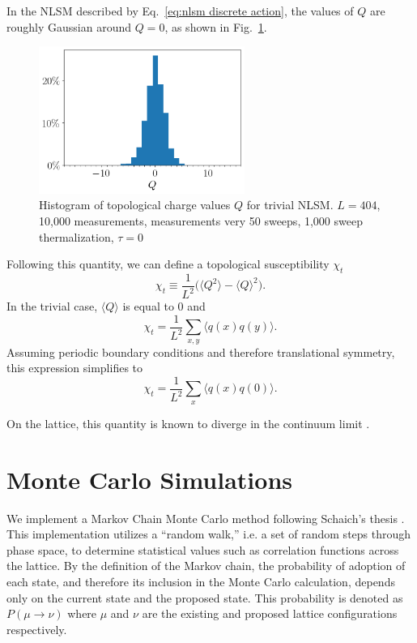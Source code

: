 In the NLSM described by Eq.~\ref{eq:nlsm discrete action}, the values of $Q$ are roughly Gaussian around $Q=0$, as shown in Fig.~\ref{fig:hist}.
\begin{figure}[h]
    \centering
      \includegraphics[width=0.6\textwidth]{imgs/hist.png}
      \caption{\label{fig:hist} Histogram of topological charge values $Q$ for trivial NLSM. $L=404$, 10,000 measurements, measurements very 50 sweeps, 1,000 sweep thermalization, $\tau=0$}
\end{figure}

Following this quantity, we can define a topological susceptibility $\chi_t$
\begin{equation}
\chi_t \equiv \frac{1}{L^2} \Big( \langle Q^2 \rangle - \langle Q \rangle^2 \Big).
\end{equation}
In the trivial case, $\langle Q \rangle$ is equal to $0$ and   
\begin{equation}
    \chi_t = \frac{1}{L^2} \sum_{x,y} \langle q(x)q(y)\rangle.
\end{equation}
Assuming periodic boundary conditions and therefore translational symmetry, this expression simplifies to 
\begin{equation}
    \chi_t = \frac{1}{L^2} \sum_{x} \langle q(x)q(0)\rangle.
\end{equation}

On the lattice, this quantity is known to diverge in the continuum limit \cite{bietenholz2018}. %


\section{Monte Carlo Simulations}
\label{sec:mc}
We implement a Markov Chain Monte Carlo method following Schaich's thesis \cite{schaich2006}. This implementation utilizes a ``random walk,'' i.e. a set of random steps through phase space, to determine statistical values such as correlation functions across the lattice. By the definition of the Markov chain, the probability of adoption of each state, and therefore its inclusion in the Monte Carlo calculation, depends only on the current state and the proposed state. This probability is denoted as $P(\mu\rightarrow\nu)$ where $\mu$ and $\nu$ are the existing and proposed lattice configurations respectively.


